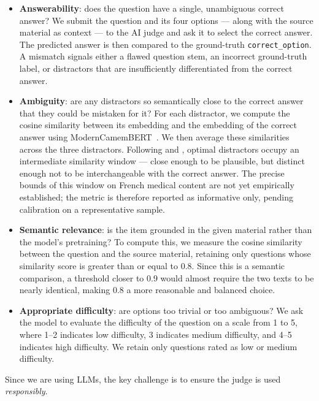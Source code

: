 \documentclass[11pt]{article}
\begin{document}
\begin{itemize}[leftmargin=*]
  \item \textbf{Answerability}: does the question have a single, unambiguous correct answer? We submit the question and its four options --- along with the source material as context --- to the AI judge and ask it to select the correct answer. The predicted answer is then compared to the ground-truth \texttt{correct\_option}. A mismatch signals either a flawed question stem, an incorrect ground-truth label, or distractors that are insufficiently differentiated from the correct answer.

  \item \textbf{Ambiguity}: are any distractors so semantically close to the correct answer that they could be mistaken for it? For each distractor, we compute the cosine similarity between its embedding and the embedding of the correct answer using ModernCamemBERT~\cite{labrak2023moderncamembert}. We then average these similarities across the three distractors. Following \citet{mitkov2009computer} and \citet{yeung2019difficulties}, optimal distractors occupy an intermediate similarity window --- close enough to be plausible, but distinct enough not to be interchangeable with the correct answer. The precise bounds of this window on French medical content are not yet empirically established; the metric is therefore reported as informative only, pending calibration on a representative sample.

  \item \textbf{Semantic relevance}: is the item grounded in the given material rather than the model's pretraining? To compute this, we measure the cosine similarity between the question and the source material, retaining only questions whose similarity score is greater than or equal to 0.8. Since this is a semantic comparison, a threshold closer to 0.9 would almost require the two texts to be nearly identical, making 0.8 a more reasonable and balanced choice.

  \item \textbf{Appropriate difficulty}: are options too trivial or too ambiguous? We ask the model to evaluate the difficulty of the question on a scale from 1 to 5, where 1--2 indicates low difficulty, 3 indicates medium difficulty, and 4--5 indicates high difficulty. We retain only questions rated as low or medium difficulty.
\end{itemize}

Since we are using LLMs, the key challenge is to ensure the judge is used \emph{responsibly}.
\end{document}

